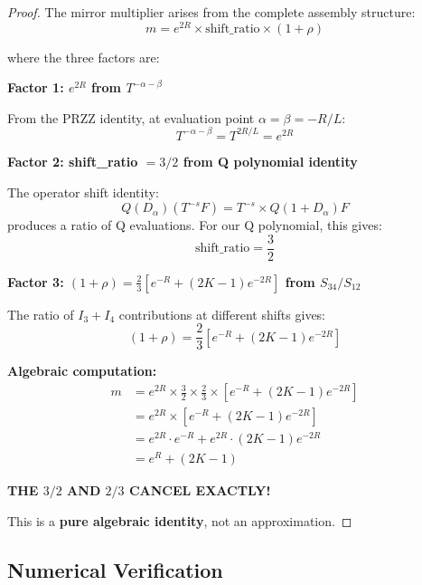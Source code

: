\documentclass[11pt]{article}
\begin{document}
\begin{proof}
The mirror multiplier arises from the complete assembly structure:
\begin{equation}
m = e^{2R} \times \text{shift\_ratio} \times (1+\rho)
\end{equation}

where the three factors are:

\textbf{Factor 1: $e^{2R}$ from $T^{-\alpha-\beta}$}

From the PRZZ identity, at evaluation point $\alpha = \beta = -R/L$:
\begin{equation}
T^{-\alpha-\beta} = T^{2R/L} = e^{2R}
\end{equation}

\textbf{Factor 2: shift\_ratio $= 3/2$ from Q polynomial identity}

The operator shift identity:
\begin{equation}
Q(D_\alpha)(T^{-s}F) = T^{-s} \times Q(1 + D_\alpha)F
\end{equation}
produces a ratio of Q evaluations. For our Q polynomial, this gives:
\begin{equation}
\text{shift\_ratio} = \frac{3}{2}
\end{equation}

\textbf{Factor 3: $(1+\rho) = \frac{2}{3}[e^{-R} + (2K-1)e^{-2R}]$ from $S_{34}/S_{12}$}

The ratio of $I_3+I_4$ contributions at different shifts gives:
\begin{equation}
(1+\rho) = \frac{2}{3}\left[e^{-R} + (2K-1)e^{-2R}\right]
\end{equation}

\textbf{Algebraic computation:}
\begin{align}
m &= e^{2R} \times \frac{3}{2} \times \frac{2}{3} \times \left[e^{-R} + (2K-1)e^{-2R}\right] \\
&= e^{2R} \times \left[e^{-R} + (2K-1)e^{-2R}\right] \\
&= e^{2R} \cdot e^{-R} + e^{2R} \cdot (2K-1)e^{-2R} \\
&= e^{R} + (2K-1)
\end{align}

\textbf{THE $3/2$ AND $2/3$ CANCEL EXACTLY!}

This is a \textcolor{exact}{\textbf{pure algebraic identity}}, not an approximation.
\end{proof}

\subsection{Numerical Verification}
\end{document}
